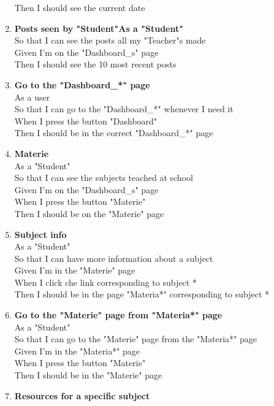 \documentclass[Lau, binding=0.6cm, oneside]{sapthesis}
\begin{document}
\begin{enumerate}
			Then I should see the current date\\
	\item \textbf{Posts seen by "Student"As a "Student"}\\
			So that I can see the posts all my "Teacher"s made\\
			Given I’m on the "Dashboard\_s" page\\
			Then I should see the 10 most recent posts\\
	\item \textbf{Go to the "Dashboard\_*" page}\\
			As a user\\
			So that I can go to the "Dashboard\_*" whenever I need it\\
			When I press the button "Dashboard"\\
			Then I should be in the correct "Dashboard\_*" page\\
	\item \textbf{Materie}\\
			As a "Student"\\
			So that I can see the subjects teached at school\\
			Given I’m on the "Dashboard\_s" page\\
			When I press the button "Materie"\\
			Then I should be on the "Materie" page\\
	\item \textbf{Subject info}\\
			As a "Student"\\
			So that I can have more information about a subject\\
			Given I’m in the "Materie" page\\
			When I click che link corresponding to subject *\\
			Then I should be in the page "Materia*" corresponding to subject *\\
	\item \textbf{Go to the "Materie" page from "Materia*" page}\\
			As a "Student"\\
			So that I can go to the "Materie" page from the "Materia*" page\\
			Given I’m in the "Materia*" page\\
			When I press the button "Materie"\\
			Then I should be in the "Materie" page\\
	\item \textbf{Resources for a specific subject}\\

\end{enumerate}
\end{document}
